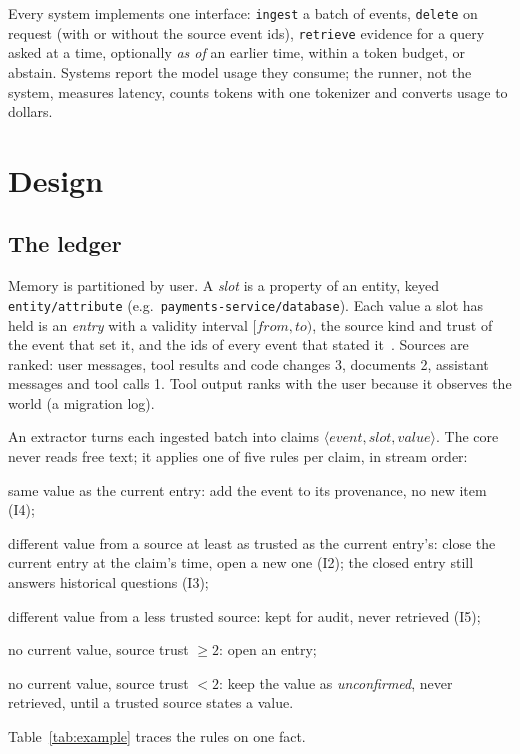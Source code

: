 \documentclass[10pt,conference]{IEEEtran}
\begin{document}
Every system implements one interface: \texttt{ingest} a batch of events,
\texttt{delete} on request (with or without the source event ids),
\texttt{retrieve} evidence for a query asked at a time, optionally \emph{as
of} an earlier time, within a token budget, or abstain. Systems report the
model usage they consume; the runner, not the system, measures latency,
counts tokens with one tokenizer and converts usage to dollars.

\section{Design}
\label{sec:design}

\subsection{The ledger}
\label{sec:ledger}

Memory is partitioned by user. A \emph{slot} is a property of an entity,
keyed \texttt{entity/attribute} (e.g.\ \texttt{payments-service/database}).
Each value a slot has held is an \emph{entry} with a validity interval
$[\mathit{from}, \mathit{to})$, the source kind and trust of the event that
set it, and the ids of every event that stated it~\cite{snodgrass1999temporal}.
Sources are ranked: user messages, tool results and code changes 3,
documents 2, assistant messages and tool calls 1. Tool output ranks with the
user because it observes the world (a migration log).

An extractor turns each ingested batch into claims
$\langle\mathit{event}, \mathit{slot}, \mathit{value}\rangle$. The core never
reads free text; it applies one of five rules per claim, in stream order:
\begin{description}
\item[restate] same value as the current entry: add the event to its
  provenance, no new item (I4);
\item[supersede] different value from a source at least as trusted as the
  current entry's: close the current entry at the claim's time, open a new one
  (I2); the closed entry still answers historical questions (I3);
\item[dispute] different value from a less trusted source: kept for audit,
  never retrieved (I5);
\item[introduce] no current value, source trust $\geq 2$: open an entry;
\item[hold] no current value, source trust $< 2$: keep the value as
  \emph{unconfirmed}, never retrieved, until a trusted source states a value.
\end{description}
Table~\ref{tab:example} traces the rules on one fact.
\end{document}
